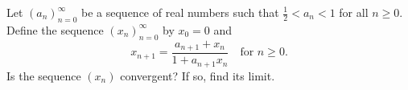 Let \((a_n)_{n=0}^\infty\) be a sequence of real numbers such that \(\frac{1}{2} < a_n < 1\) for all \(n \geq 0\).
Define the sequence \((x_n)_{n=0}^\infty\) by \(x_0 = 0\) and
\[ x_{n+1} = \frac{a_{n+1} + x_n}{1 + a_{n+1} x_n} \quad \text{for } n \geq 0. \]
Is the sequence \((x_n)\) convergent? If so, find its limit.